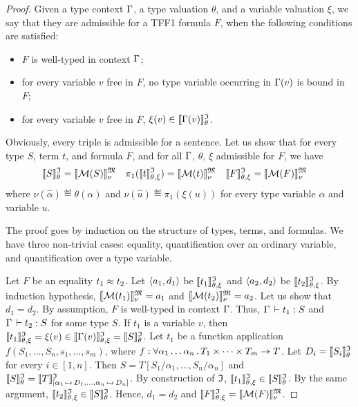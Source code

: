\begin{proof}
Given a type context $\mathrm{\Gamma}$, a type valuation $\theta$,
and a variable valuation $\xi$, we say that they are admissible
for a TFF1 formula $F$, when the following conditions are satisfied:
\begin{itemize}
\item $F$ is well-typed in context $\mathrm{\Gamma}$;
\item for every variable $v$ free in $F$, no type variable
occurring in $\mathrm{\Gamma}(v)$ is bound in $F$;
\item for every variable $v$ free in $F$, $\xi(v) \in \llbracket\mathrm{\Gamma}(v)\rrbracket^{\mathfrak{I}}_{\theta}$.
\end{itemize}
Obviously, every triple is admissible for a sentence.
Let us show that for every type $S$, term $t$, and formula $F$,
and for all $\mathrm{\Gamma}$, $\theta$, $\xi$ admissible for $F$, we have
\begin{align*}
\llbracket S\rrbracket^{\mathfrak{I}}_{\theta} &= \llbracket \mathcal{M}(S) \rrbracket^{\mathfrak{M}}_{\nu} &
\pi_1(\llbracket t\rrbracket^{\mathfrak{I}}_{\theta,\xi}) &= \llbracket \mathcal{M}(t) \rrbracket^{\mathfrak{M}}_{\nu} &
\llbracket F\rrbracket^{\mathfrak{I}}_{\theta,\xi} &= \llbracket \mathcal{M}(F) \rrbracket^{\mathfrak{M}}_{\nu}
\end{align*}
where $\nu(\hat{\alpha}) \eqdef \theta(\alpha)$ and
$\nu(\hat{u}) \eqdef \pi_1(\xi(u))$
for every type variable $\alpha$ and variable $u$.

The proof goes by induction on the structure of types, terms, and formulas.
We have three non-trivial cases: equality, quantification over an ordinary
variable, and quantification over a type variable.

Let $F$ be an equality $t_1 \approx t_2$.
Let $\langle a_1, d_1 \rangle$ be $\llbracket t_1\rrbracket^{\mathfrak{I}}_{\theta,\xi}$ and $\langle a_2, d_2 \rangle$ be $\llbracket t_2\rrbracket^{\mathfrak{I}}_{\theta,\xi}$.
By induction hypothesis, $\llbracket \mathcal{M}(t_1) \rrbracket^{\mathfrak{M}}_{\nu} = a_1$ and
$\llbracket \mathcal{M}(t_2) \rrbracket^{\mathfrak{M}}_{\nu} = a_2$. Let us show that $d_1 = d_2$.
By assumption, $F$ is well-typed in context $\mathrm{\Gamma}$.
Thus, $\mathrm{\Gamma}\,\vdash t_1 \mathrel{:} S$ and $\mathrm{\Gamma}\,\vdash t_2 \mathrel{:} S$
for some type $S$.
If $t_1$ is a variable $v$, then
$\llbracket t_1\rrbracket^{\mathfrak{I}}_{\theta,\xi} = \xi(v) \in \llbracket\mathrm{\Gamma}(v)\rrbracket^{\mathfrak{I}}_{\theta,\xi} = \llbracket S\rrbracket^{\mathfrak{I}}_{\theta}$.
Let $t_1$ be a function application $f(S_1,\dots,S_n,s_1,\dots,s_m)$,
where $f \mathrel{:}
\forall \alpha_1\dots\alpha_n \,.\, T_1 \times \dots \times T_m \to T$.
Let $D_i = \llbracket S_i\rrbracket^{\mathfrak{I}}_{\theta}$ for every $i \in [1,n]$.
Then $S = T[S_1/\alpha_1,\dots,S_n/\alpha_n]$ and
$\llbracket S\rrbracket^{\mathfrak{I}}_{\theta} = \llbracket T \rrbracket^{\mathfrak{I}}_{[\alpha_1 \,\mapsto\, D_1,\dots,
\alpha_n \,\mapsto\, D_n]}$.
By construction of $\mathfrak{I}$, $\llbracket t_1\rrbracket^{\mathfrak{I}}_{\theta,\xi} \in \llbracket S\rrbracket^{\mathfrak{I}}_{\theta}$.
By the same argument, $\llbracket t_2\rrbracket^{\mathfrak{I}}_{\theta,\xi} \in \llbracket S\rrbracket^{\mathfrak{I}}_{\theta}$.
Hence, $d_1 = d_2$ and $\llbracket F\rrbracket^{\mathfrak{I}}_{\theta,\xi} = \llbracket \mathcal{M}(F) \rrbracket^{\mathfrak{M}}_{\nu}$.


\end{proof}
